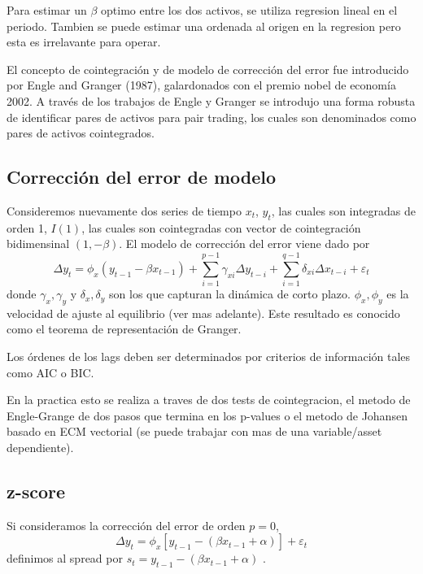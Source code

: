 \documentclass{myarticle}
\begin{document}
Para estimar un $\beta$ optimo entre los dos activos, se utiliza regresion lineal en el periodo. Tambien se puede estimar una ordenada al origen en la regresion pero esta es irrelavante para operar.

El concepto de cointegraci\'on y de modelo de correcci\'on del error fue introducido por Engle and Granger (1987), galardonados con el premio nobel de econom\'ia 2002. A trav\'es de los trabajos de Engle y Granger se introdujo una forma robusta de identificar pares de activos para pair trading, los cuales son denominados como pares de activos cointegrados.


\subsection{Correcci\'on del error de modelo}
\label{sec:orgb45176a}

Consideremos nuevamente dos series de tiempo \(x_t\), \(y_t\), las cuales son integradas de orden 1, \(I(1)\), las cuales son cointegradas con vector de cointegraci\'on bidimensinal \((1, -\beta)\). El modelo de correcci\'on del error viene dado por
\[
\Delta y_t = \phi_x (y_{t-1} - \beta x_{t-1}) + \sum_{i=1}^{p-1} \gamma_{xi} \Delta y_{t-i} + \sum_{i=1}^{q-1} \delta_{xi} \Delta x_{t-i} + \varepsilon_t
\]
donde \(\gamma_x,\gamma_y\) y \(\delta_x,\delta_y\) son los que capturan la din\'amica de corto plazo. \(\phi_x,\phi_y\) es la velocidad de ajuste al equilibrio (ver mas adelante).
Este resultado es conocido como el teorema de representaci\'on de Granger.


Los \'ordenes de los lags deben ser determinados por criterios de informaci\'on tales como AIC o BIC.

En la practica esto se realiza a traves de dos tests de cointegracion, el metodo de Engle-Grange de dos pasos que termina en los p-values o el metodo de Johansen basado en ECM vectorial (se puede trabajar con mas de una variable/asset dependiente).


\subsection{z-score}

Si consideramos la correcci\'on del error de orden $p=0$,  
\[
\Delta y_t = \phi_x [y_{t-1} - (\beta x_{t-1} +\alpha)] +  \varepsilon_t
\]
definimos al spread por $s_t=y_{t-1} - (\beta x_{t-1} +\alpha)$ . %
\end{document}
